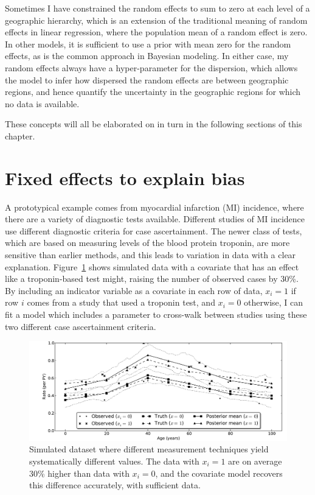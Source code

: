 Sometimes I have constrained the random effects to sum to zero at each
level of a geographic hierarchy, which is an extension of the
traditional meaning of random effects in linear regression, where the
population mean of a random effect is zero.  In other models, it is
sufficient to use a prior with mean zero for the random effects, as is
the common approach in Bayesian modeling.  In either case, my random
effects always have a hyper-parameter for the dispersion, which allows
the model to infer how dispersed the random effects are between
geographic regions, and hence quantify the uncertainty in the
geographic regions for which no data is available.

These concepts will all be elaborated on in turn in the following
sections of this chapter.

\section{Fixed effects to explain bias}

A prototypical example comes from myocardial infarction (MI)
incidence, where there are a variety of diagnostic tests available.
Different studies of MI incidence use different diagnostic criteria
for case ascertainment.  The newer class of tests, which are based on
measuring levels of the blood protein troponin, are more sensitive
than earlier methods, and this leads to variation in data with a clear
explanation.  Figure~\ref{cov-sim} shows simulated data with a
covariate that has an effect like a troponin-based test might, raising
the number of observed cases by 30\%. By including an indicator
variable as a covariate in each row of data, $x_i = 1$ if row $i$
comes from a study that used a troponin test, and $x_i = 0$ otherwise,
I can fit a model which includes a parameter to cross-walk between
studies using these two different case ascertainment criteria.

\begin{figure}[h]
\begin{center}
\includegraphics[width=\textwidth]{cov_fe.pdf}
\caption{Simulated dataset where different measurement techniques
  yield systematically different values. The data with $x_i=1$ are on
  average 30\% higher than data with $x_i=0$, and the covariate model
  recovers this difference accurately, with sufficient data.}
\label{cov-sim}
\end{center}
\end{figure}

